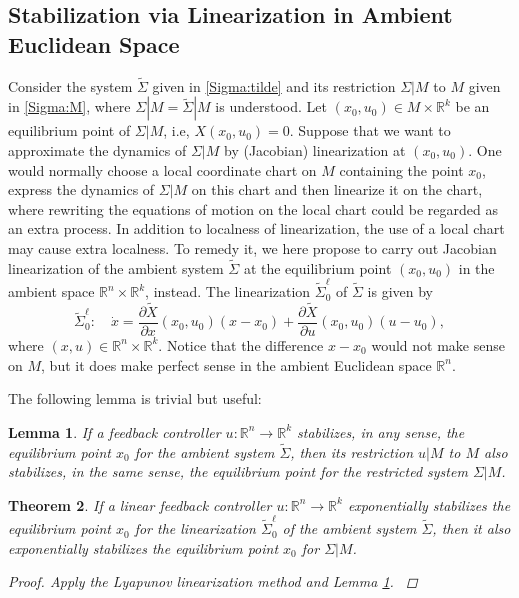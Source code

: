 \documentclass[letterpaper, 10 pt, conference]{ieeeconf}  %
\newtheorem{theorem}{Theorem}[section]
\newtheorem{lemma}[theorem]{Lemma}
\newcommand{\dimu}{{k}}
\begin{document}
\subsection{Stabilization via Linearization in Ambient Euclidean Space}
Consider the system $\tilde \Sigma$ given in \eqref{Sigma:tilde} and its restriction $\Sigma | M$ to $M$ given in \eqref{Sigma:M}, where  $\Sigma | M =\tilde  \Sigma | M$ is understood. Let $(x_0,u_0) \in M \times \mathbb R^\dimu$ be an equilibrium point of $\Sigma |M$, i.e, $X(x_0,u_0) = 0$. 
Suppose that we want to approximate the dynamics of $\Sigma | M$ by (Jacobian) linearization at  $(x_0, u_0)$.  One would normally choose a local coordinate chart on $M$ containing the point $x_0$,  express the dynamics of $\Sigma |M$ on this chart and then linearize it on the chart, where rewriting the  equations of motion on the local chart could be regarded as an extra process. In addition to localness of linearization, the use of a local chart may cause  extra localness. To remedy it, we here propose to carry out Jacobian linearization of the ambient system $\tilde \Sigma $ at the equilibrium point $(x_0, u_0)$ in the ambient space $\mathbb R^n \times \mathbb R^\dimu$, instead.  The linearization $\tilde \Sigma^\ell_0$ of $\tilde \Sigma $ is given by
\[
\tilde \Sigma^\ell_0: \quad \dot x = \frac{\partial \tilde X}{\partial x}(x_0,u_0) (x-x_0) +  \frac{\partial \tilde X}{\partial u}(x_0,u_0) (u-u_0),
\]
where $(x,u) \in \mathbb R^n \times \mathbb R^\dimu$. Notice that the difference $x-x_0$ would not make  sense on $M$, but it  does make  perfect sense in the ambient Euclidean space $\mathbb R^n$.

The following lemma is trivial but useful:
\begin{lemma}\label{lemma:exp:stab}
If a feedback controller $u: \mathbb R^n \rightarrow \mathbb R^\dimu$ stabilizes, in any sense, the equilibrium point $x_0$ for the ambient system $\tilde \Sigma$, then its restriction $u |M$ to $M$ also stabilizes, in the same sense, the equilibrium point for the restricted system $\Sigma | M$. 
\end{lemma}
\begin{theorem}\label{theorem:linear:point:stab}
If a linear feedback controller $u : \mathbb R^n \rightarrow \mathbb R^\dimu$ exponentially stabilizes the equilibrium point $x_0$ for the linearization $\tilde \Sigma^\ell_0$ of the ambient system $\tilde \Sigma$, then it also exponentially stabilizes the equilibrium point $x_0$ for $\Sigma |M$. 

\begin{proof}{\rm
Apply the Lyapunov linearization method and Lemma \ref{lemma:exp:stab}. 
}\end{proof}
\end{theorem}
\end{document}
